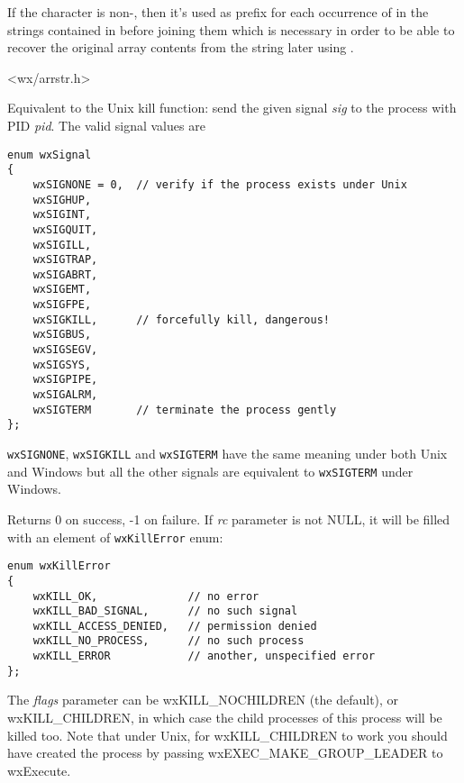 If the  character is non-\NULL, then it's used as prefix for each occurrence of 
in the strings contained in  before joining them which is necessary
in order to be able to recover the original array contents from the string
later using .


<wx/arrstr.h>


\label{wxkill}


Equivalent to the Unix kill function: send the given signal {\it sig} to the
process with PID {\it pid}. The valid signal values are

\begin{verbatim}
enum wxSignal
{
    wxSIGNONE = 0,  // verify if the process exists under Unix
    wxSIGHUP,
    wxSIGINT,
    wxSIGQUIT,
    wxSIGILL,
    wxSIGTRAP,
    wxSIGABRT,
    wxSIGEMT,
    wxSIGFPE,
    wxSIGKILL,      // forcefully kill, dangerous!
    wxSIGBUS,
    wxSIGSEGV,
    wxSIGSYS,
    wxSIGPIPE,
    wxSIGALRM,
    wxSIGTERM       // terminate the process gently
};
\end{verbatim}

{\tt wxSIGNONE}, {\tt wxSIGKILL} and {\tt wxSIGTERM} have the same meaning
under both Unix and Windows but all the other signals are equivalent to
{\tt wxSIGTERM} under Windows.

Returns 0 on success, -1 on failure. If {\it rc} parameter is not NULL, it will
be filled with an element of {\tt wxKillError} enum:

\begin{verbatim}
enum wxKillError
{
    wxKILL_OK,              // no error
    wxKILL_BAD_SIGNAL,      // no such signal
    wxKILL_ACCESS_DENIED,   // permission denied
    wxKILL_NO_PROCESS,      // no such process
    wxKILL_ERROR            // another, unspecified error
};
\end{verbatim}

The {\it flags} parameter can be wxKILL\_NOCHILDREN (the default),
or wxKILL\_CHILDREN, in which case the child processes of this
process will be killed too. Note that under Unix, for wxKILL\_CHILDREN
to work you should have created the process by passing wxEXEC\_MAKE\_GROUP\_LEADER
to wxExecute.


